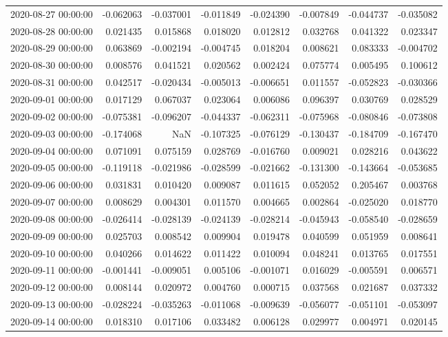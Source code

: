 \begin{tabular}{lrrrrrrr}
2020-08-27 00:00:00 & -0.062063 & -0.037001 & -0.011849 & -0.024390 & -0.007849 & -0.044737 & -0.035082 \\
2020-08-28 00:00:00 & 0.021435 & 0.015868 & 0.018020 & 0.012812 & 0.032768 & 0.041322 & 0.023347 \\
2020-08-29 00:00:00 & 0.063869 & -0.002194 & -0.004745 & 0.018204 & 0.008621 & 0.083333 & -0.004702 \\
2020-08-30 00:00:00 & 0.008576 & 0.041521 & 0.020562 & 0.002424 & 0.075774 & 0.005495 & 0.100612 \\
2020-08-31 00:00:00 & 0.042517 & -0.020434 & -0.005013 & -0.006651 & 0.011557 & -0.052823 & -0.030366 \\
2020-09-01 00:00:00 & 0.017129 & 0.067037 & 0.023064 & 0.006086 & 0.096397 & 0.030769 & 0.028529 \\
2020-09-02 00:00:00 & -0.075381 & -0.096207 & -0.044337 & -0.062311 & -0.075968 & -0.080846 & -0.073808 \\
2020-09-03 00:00:00 & -0.174068 & NaN & -0.107325 & -0.076129 & -0.130437 & -0.184709 & -0.167470 \\
2020-09-04 00:00:00 & 0.071091 & 0.075159 & 0.028769 & -0.016760 & 0.009021 & 0.028216 & 0.043622 \\
2020-09-05 00:00:00 & -0.119118 & -0.021986 & -0.028599 & -0.021662 & -0.131300 & -0.143664 & -0.053685 \\
2020-09-06 00:00:00 & 0.031831 & 0.010420 & 0.009087 & 0.011615 & 0.052052 & 0.205467 & 0.003768 \\
2020-09-07 00:00:00 & 0.008629 & 0.004301 & 0.011570 & 0.004665 & 0.002864 & -0.025020 & 0.018770 \\
2020-09-08 00:00:00 & -0.026414 & -0.028139 & -0.024139 & -0.028214 & -0.045943 & -0.058540 & -0.028659 \\
2020-09-09 00:00:00 & 0.025703 & 0.008542 & 0.009904 & 0.019478 & 0.040599 & 0.051959 & 0.008641 \\
2020-09-10 00:00:00 & 0.040266 & 0.014622 & 0.011422 & 0.010094 & 0.048241 & 0.013765 & 0.017551 \\
2020-09-11 00:00:00 & -0.001441 & -0.009051 & 0.005106 & -0.001071 & 0.016029 & -0.005591 & 0.006571 \\
2020-09-12 00:00:00 & 0.008144 & 0.020972 & 0.004760 & 0.000715 & 0.037568 & 0.021687 & 0.037332 \\
2020-09-13 00:00:00 & -0.028224 & -0.035263 & -0.011068 & -0.009639 & -0.056077 & -0.051101 & -0.053097 \\
2020-09-14 00:00:00 & 0.018310 & 0.017106 & 0.033482 & 0.006128 & 0.029977 & 0.004971 & 0.020145 \\

\end{tabular}
